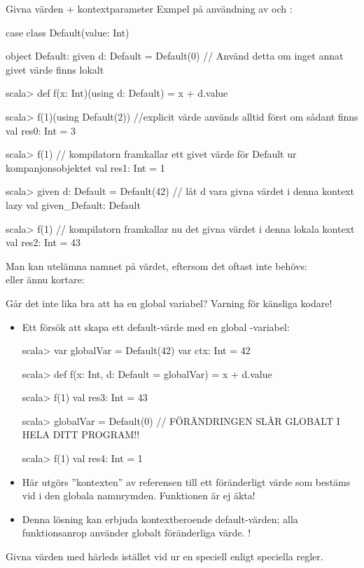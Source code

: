 \begin{Slide}{Givna värden + kontextparameter}\SlideFontSmall
Exmpel på användning av  och :
\begin{CodeSmall}
case class Default(value: Int)

object Default:
  given d: Default = Default(0)  // Använd detta om inget annat givet värde finns lokalt
\end{CodeSmall}
\begin{REPLsmall}
scala> def f(x: Int)(using d: Default) = x + d.value

scala> f(1)(using Default(2))    //explicit värde används alltid först om sådant finns
val res0: Int = 3

scala> f(1)  // kompilatorn framkallar ett givet värde för Default ur kompanjonsobjektet
val res1: Int = 1

scala> given d: Default = Default(42)  // låt d vara givna värdet i denna kontext
lazy val given_Default: Default

scala> f(1)       // kompilatorn framkallar nu det givna värdet i denna lokala kontext
val res2: Int = 43
\end{REPLsmall}
Man kan utelämna namnet på värdet, eftersom det oftast inte behövs:\\
 eller ännu kortare: 
\end{Slide}

\begin{Slide}{Går det inte lika bra att ha en global variabel?}
  \SlideFontSmall Varning för känsliga kodare!
\begin{itemize}\SlideFontSmall
\item Ett försök att skapa ett default-värde med en global -variabel:
\begin{REPLsmall}
scala> var globalVar = Default(42)
var ctx: Int = 42

scala> def f(x: Int, d: Default = globalVar) = x + d.value

scala> f(1)
val res3: Int = 43

scala> globalVar = Default(0) // FÖRÄNDRINGEN SLÅR GLOBALT I HELA DITT PROGRAM!!

scala> f(1)                                                                      
val res4: Int = 1
\end{REPLsmall} 
\item Här utgörs ''kontexten'' av referensen till ett föränderligt värde som bestäms vid  i den globala namnrymden. Funktionen  är ej äkta! 
\item Denna lösning kan  erbjuda  kontextberoende default-värden; alla funktionsanrop använder  globalt föränderliga värde. !
\end{itemize}
Givna värden med  härleds istället vid  ur en speciell   enligt speciella regler.
\end{Slide}


